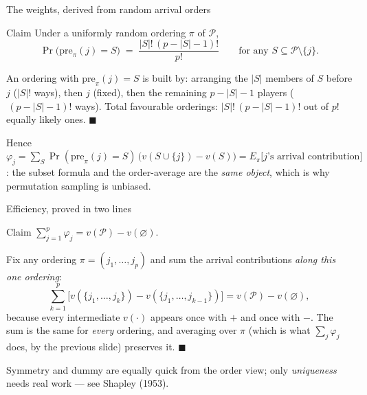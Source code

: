 \documentclass[aspectratio=169,11pt]{beamer}
\begin{document}
\begin{frame}{The weights, derived from random arrival orders}
  \footnotesize
  \begin{block}{Claim}
    Under a uniformly random ordering $\pi$ of $\mathcal{P}$,
    \[
      \Pr\bigl(\mathrm{pre}_\pi(j) = S\bigr) \;=\; \frac{|S|!\,(p-|S|-1)!}{p!}
      \qquad\text{for any } S \subseteq \mathcal{P}\setminus\{j\}.
    \]
  \end{block}
  \begin{readme}
    An ordering with $\mathrm{pre}_\pi(j)=S$ is built by: arranging the $|S|$
    members of $S$ before $j$ ($|S|!$ ways), then $j$ (fixed), then the remaining
    $p-|S|-1$ players ($\,(p-|S|-1)!$ ways). Total favourable orderings:
    $|S|!\,(p-|S|-1)!$ out of $p!$ equally likely ones. $\blacksquare$
  \end{readme}
  \begin{takeaway}
    Hence
    $\varphi_j=\sum_S \Pr(\mathrm{pre}_\pi(j)=S)\,\bigl(v(S\cup\{j\})-v(S)\bigr)
    = E_\pi\bigl[\text{$j$'s arrival contribution}\bigr]$: the subset formula and
    the order-average are the \emph{same object}, which is why permutation sampling
    is unbiased.
  \end{takeaway}
\end{frame}

\begin{frame}{Efficiency, proved in two lines}
  \footnotesize
  \begin{block}{Claim}
    $\sum_{j=1}^{p}\varphi_j = v(\mathcal{P}) - v(\varnothing)$.
  \end{block}
  \begin{readme}[Telescoping]
    Fix any ordering $\pi = (j_1,\dots,j_p)$ and sum the arrival contributions
    \emph{along this one ordering}:
    \[
      \sum_{k=1}^{p}\bigl[v(\{j_1,\dots,j_k\}) - v(\{j_1,\dots,j_{k-1}\})\bigr]
      = v(\mathcal{P}) - v(\varnothing),
    \]
    because every intermediate $v(\cdot)$ appears once with $+$ and once with $-$.
    The sum is the same for \emph{every} ordering, and averaging over $\pi$ (which is
    what $\sum_j\varphi_j$ does, by the previous slide) preserves it. $\blacksquare$
  \end{readme}
  \begin{takeaway}
    Symmetry and dummy are equally quick from the order view; only
    \emph{uniqueness} needs real work --- see Shapley (1953).
  \end{takeaway}
\end{frame}
\end{document}
